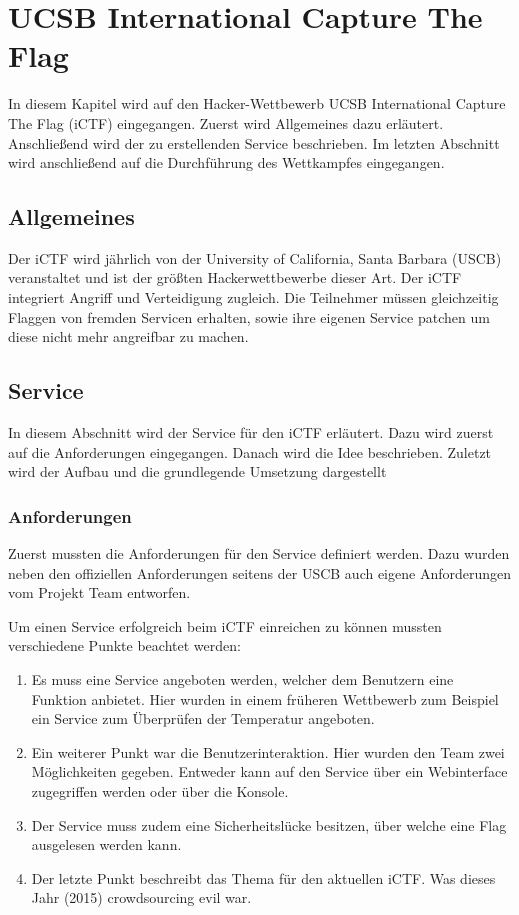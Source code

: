 \chapter{UCSB International Capture The Flag}
In diesem Kapitel wird auf den Hacker-Wettbewerb UCSB International Capture The Flag (iCTF) eingegangen. Zuerst wird Allgemeines dazu erläutert. Anschließend wird der zu erstellenden Service beschrieben. Im letzten Abschnitt wird anschließend auf die Durchführung des Wettkampfes eingegangen.

\section{Allgemeines}
Der iCTF wird jährlich von der University of California, Santa Barbara (USCB) veranstaltet und ist der größten Hackerwettbewerbe dieser Art. 
Der iCTF integriert Angriff und Verteidigung zugleich. Die Teilnehmer müssen gleichzeitig Flaggen von fremden Servicen erhalten, sowie ihre eigenen Service patchen um diese nicht mehr angreifbar zu machen.

\section{Service}
In diesem Abschnitt wird der Service für den iCTF erläutert. Dazu wird zuerst auf die Anforderungen eingegangen. Danach wird die Idee beschrieben. Zuletzt wird der Aufbau und die grundlegende Umsetzung dargestellt

\subsection{Anforderungen}
Zuerst mussten die Anforderungen für den Service definiert werden. Dazu wurden neben den offiziellen Anforderungen seitens der USCB auch eigene Anforderungen vom Projekt Team entworfen.

Um einen Service erfolgreich beim iCTF einreichen zu können mussten verschiedene Punkte beachtet werden:

\begin{enumerate}
\item Es muss eine Service angeboten werden, welcher dem Benutzern eine Funktion anbietet. Hier wurden in einem früheren Wettbewerb zum Beispiel ein Service zum Überprüfen der Temperatur angeboten.
\item Ein weiterer Punkt war die Benutzerinteraktion. Hier wurden den Team zwei Möglichkeiten gegeben. Entweder kann auf den Service über ein Webinterface zugegriffen werden oder über die Konsole.
\item Der Service muss zudem eine Sicherheitslücke besitzen, über welche eine Flag ausgelesen werden kann. 
\item Der letzte Punkt beschreibt das Thema für den aktuellen iCTF. Was dieses Jahr (2015) crowdsourcing evil war.
\end{enumerate}

